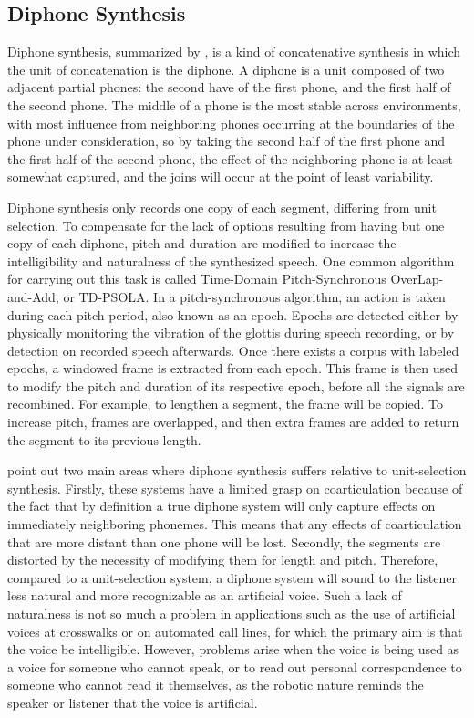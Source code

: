 \documentclass[12pt]{article}
\begin{document}
	\subsection{Diphone Synthesis}

	Diphone synthesis, summarized by \citet{slp}, is a kind of concatenative synthesis in which the unit of concatenation is the diphone. A diphone is a unit composed of two adjacent partial phones: the second have of the first phone, and the first half of the second phone. The middle of a phone is the most stable across environments, with most influence from neighboring phones occurring at the boundaries of the phone under consideration, so by taking the second half of the first phone and the first half of the second phone, the effect of the neighboring phone is at least somewhat captured, and the joins will occur at the point of least variability. \par

	Diphone synthesis only records one copy of each segment, differing from unit selection. To compensate for the lack of options resulting from having but one copy of each diphone, pitch and duration are modified to increase the intelligibility and naturalness of the synthesized speech. One common algorithm for carrying out this task is called Time-Domain Pitch-Synchronous OverLap-and-Add, or TD-PSOLA. In a pitch-synchronous algorithm, an action is taken during each pitch period, also known as an epoch. Epochs are detected either by physically monitoring the vibration of the glottis during speech recording, or by detection on recorded speech afterwards. Once there exists a corpus with labeled epochs, a windowed frame is extracted from each epoch. This frame is then used to modify the pitch and duration of its respective epoch, before all the signals are recombined. For example, to lengthen a segment, the frame will be copied. To increase pitch, frames are overlapped, and then extra frames are added to return the segment to its previous length. \par

	\citet{slp} point out two main areas where diphone synthesis suffers relative to unit-selection synthesis. Firstly, these systems have a limited grasp on coarticulation because of the fact that by definition a true diphone system will only capture effects on immediately neighboring phonemes. This means that any effects of coarticulation that are more distant than one phone will be lost. Secondly, the segments are distorted by the necessity of modifying them for length and pitch. Therefore, compared to a unit-selection system, a diphone system will sound to the listener less natural and more recognizable as an artificial voice. Such a lack of naturalness is not so much a problem in applications such as the use of artificial voices at crosswalks or on automated call lines, for which the primary aim is that the voice be intelligible. However, problems arise when the voice is being used as a voice for someone who cannot speak, or to read out personal correspondence to someone who cannot read it themselves, as the robotic nature reminds the speaker or listener that the voice is artificial. \par
\end{document}
